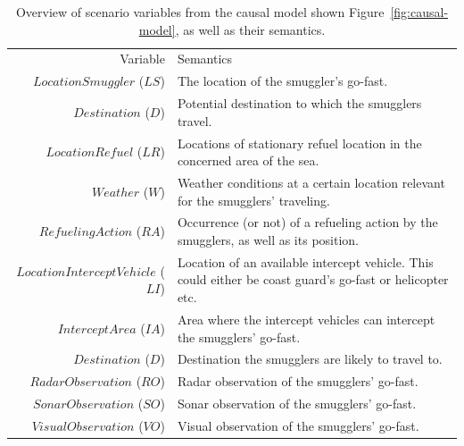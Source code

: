 \documentclass[conference]{IEEEtran}
\begin{document}
\begin{table}[!ht]
 \centering
 \caption{Overview of scenario variables from the causal model shown Figure~\ref{fig:causal-model}, as well as their semantics.}
 \begin{tabular}[!ht]{rp{5cm}}
\toprule
 Variable & Semantics \\
\cmidrule(r){1-1}
\cmidrule(l){2-2}
$LocationSmuggler$ ($LS$) &
The location of the smuggler's go-fast. \\
$Destination$ ($D$) &
Potential destination to which the smugglers travel. \\
$LocationRefuel$ ($LR$) &
Locations of stationary refuel location in the concerned area of the sea. \\
$Weather$ ($W$) &
Weather conditions at a certain location relevant for the smugglers' traveling. \\
$RefuelingAction$ ($RA$) &
Occurrence (or not) of a refueling action by the smugglers, as well as its position. \\
$LocationInterceptVehicle$ ($LI$) &
Location of an available intercept vehicle. This could either be coast guard's go-fast or helicopter etc. \\
$InterceptArea$ ($IA$) &
Area where the intercept vehicles can intercept the smugglers' go-fast. \\
$Destination$ ($D$) &
Destination the smugglers are likely to travel to. \\
$RadarObservation$ ($RO$) &
Radar observation of the smugglers' go-fast. \\
$SonarObservation$ ($SO$) &
Sonar observation of the smugglers' go-fast. \\
$VisualObservation$ ($VO$) &
Visual observation of the smugglers' go-fast. \\
\bottomrule
\end{tabular}
\label{tab:scenario-variables}
\end{table}




\end{document}
